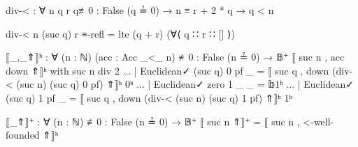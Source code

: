 \documentclass[./Thesis.tex]{subfiles}
\begin{document}
\begin{code}
  div-< : ∀ n q r {q≢0 : False (q ≟ 0)} → n ≡ r + 2 * q → q < n
\end{code}
\begin{code}[hide]
  div-< n (suc q) r ≡-refl = lte (q + r) (∀⟨ q ∷ r ∷ [] ⟩)
\end{code}
\begin{code}
  ⟦_,_⇑⟧ʰ : ∀ (n : ℕ) (acc : Acc _<_ n) {≢0 : False (n ≟ 0)} → 𝔹⁺
  ⟦ suc n , acc down ⇑⟧ʰ with suc n div 2
  ... | Euclidean✓ (suc q) 0 pf _ = ⟦ suc q , down (div-< (suc n) (suc q) 0 pf) ⇑⟧ʰ 0ᵇ
  ... | Euclidean✓ zero    1 _ _ = 𝕓1ᵇ
  ... | Euclidean✓ (suc q) 1 pf _ = ⟦ suc q , down (div-< (suc n) (suc q) 1 pf) ⇑⟧ʰ 1ᵇ

  ⟦_⇑⟧⁺ : ∀ (n : ℕ) {≢0 : False (n ≟ 0)} → 𝔹⁺
  ⟦ suc n ⇑⟧⁺ = ⟦ suc n , <-well-founded ⇑⟧ʰ
\end{code}
\end{document}
